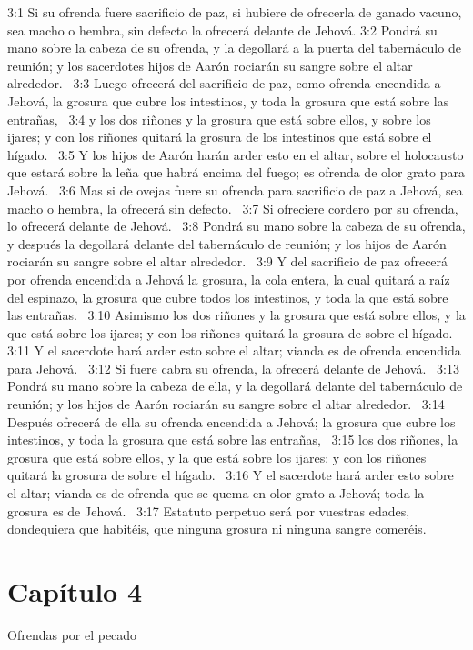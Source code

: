 3:1 Si su ofrenda fuere sacrificio de paz, si hubiere de ofrecerla de ganado vacuno, sea macho o hembra, sin defecto la ofrecerá delante de Jehová. 
3:2 Pondrá su mano sobre la cabeza de su ofrenda, y la degollará a la puerta del tabernáculo de reunión; y los sacerdotes hijos de Aarón rociarán su sangre sobre el altar alrededor.  
3:3 Luego ofrecerá del sacrificio de paz, como ofrenda encendida a Jehová, la grosura que cubre los intestinos, y toda la grosura que está sobre las entrañas,  
3:4 y los dos riñones y la grosura que está sobre ellos, y sobre los ijares; y con los riñones quitará la grosura de los intestinos que está sobre el hígado.  
3:5 Y los hijos de Aarón harán arder esto en el altar, sobre el holocausto que estará sobre la leña que habrá encima del fuego; es ofrenda de olor grato para Jehová.  
3:6 Mas si de ovejas fuere su ofrenda para sacrificio de paz a Jehová, sea macho o hembra, la ofrecerá sin defecto.  
3:7 Si ofreciere cordero por su ofrenda, lo ofrecerá delante de Jehová.  
3:8 Pondrá su mano sobre la cabeza de su ofrenda, y después la degollará delante del tabernáculo de reunión; y los hijos de Aarón rociarán su sangre sobre el altar alrededor.  
3:9 Y del sacrificio de paz ofrecerá por ofrenda encendida a Jehová la grosura, la cola entera, la cual quitará a raíz del espinazo, la grosura que cubre todos los intestinos, y toda la que está sobre las entrañas.  
3:10 Asimismo los dos riñones y la grosura que está sobre ellos, y la que está sobre los ijares; y con los riñones quitará la grosura de sobre el hígado.  
3:11 Y el sacerdote hará arder esto sobre el altar; vianda es de ofrenda encendida para Jehová.  
3:12 Si fuere cabra su ofrenda, la ofrecerá delante de Jehová.  
3:13 Pondrá su mano sobre la cabeza de ella, y la degollará delante del tabernáculo de reunión; y los hijos de Aarón rociarán su sangre sobre el altar alrededor.  
3:14 Después ofrecerá de ella su ofrenda encendida a Jehová; la grosura que cubre los intestinos, y toda la grosura que está sobre las entrañas,  
3:15 los dos riñones, la grosura que está sobre ellos, y la que está sobre los ijares; y con los riñones quitará la grosura de sobre el hígado.  
3:16 Y el sacerdote hará arder esto sobre el altar; vianda es de ofrenda que se quema en olor grato a Jehová; toda la grosura es de Jehová.  
3:17 Estatuto perpetuo será por vuestras edades, dondequiera que habitéis, que ninguna grosura ni ninguna sangre comeréis.  
\section*{Capítulo 4 }
Ofrendas por el pecado  

